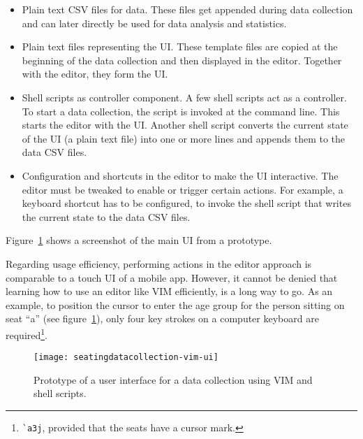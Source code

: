 \begin{itemize}

  \item Plain text \acs{CSV} files for data.
    These files get appended during data collection and can later directly be
    used for data analysis and statistics.

  \item Plain text files representing the \acs{UI}.
    These template files are copied at the beginning of the data collection and
    then displayed in the editor.
    Together with the editor, they form the \acl{UI}.

  \item Shell scripts as controller component.
    A few shell scripts act as a controller.
    To start a data collection, the script  is invoked
    at the command line. This starts the editor with the \acs{UI}. Another shell
    script converts the current state of the \acs{UI} (a plain text file) into
    one or more lines and appends them to the data \acs{CSV} files.

  \item Configuration and shortcuts in the editor to make the \acs{UI}
    interactive.
    The editor must be tweaked to enable or trigger certain actions.
    For example, a keyboard shortcut has to be configured, to invoke the shell
    script that writes the current state to the data \acs{CSV} files.

\end{itemize}

Figure~\ref{fig:seatingdatacollection-vim-ui} shows a screenshot of the main
\acs{UI} from a prototype.

Regarding usage efficiency, performing actions in the editor approach is
comparable to a touch \acs{UI} of a mobile app.
However, it cannot be denied that learning how to use an editor like VIM
efficiently, is a long way to go.
As an example, to position the cursor to enter the age group for the person
sitting on seat ``a'' (see figure~\ref{fig:seatingdatacollection-vim-ui}), only
four key strokes on a computer keyboard are required\footnote{\verb|`a3j|,
  provided that the seats have a cursor mark.}.

\begin{figure}[htb]
  \centering
  \texttt{[image: seatingdatacollection-vim-ui]}
  \caption[Prototype of a user interface for data collection using VIM.]%
  {Prototype of a user interface for a data collection using VIM and shell
  scripts.}
\label{fig:seatingdatacollection-vim-ui}
\end{figure}

